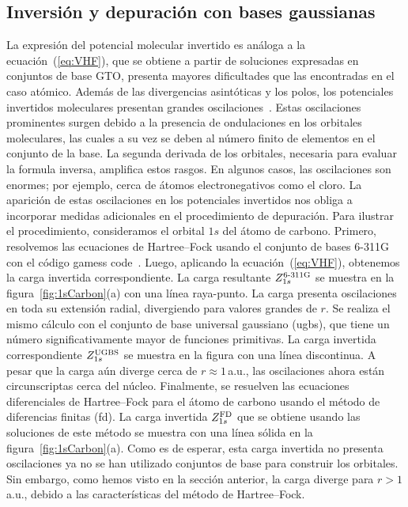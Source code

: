 \subsection{Inversión y depuración con bases gaussianas}
\label{subsec:invdepGTO}

La expresión del potencial molecular invertido es análoga a la
ecuación~(\ref{eq:VHF}), que se obtiene a partir de soluciones expresadas
en conjuntos de base GTO, presenta mayores dificultades que las encontradas
en el caso atómico. Además de las divergencias asintóticas y los polos, 
los potenciales invertidos moleculares presentan grandes 
oscilaciones~\cite{Schipper1997,Mura1997,Jacob2011,Gaiduk2013}. 
Estas oscilaciones prominentes surgen debido a la presencia de 
ondulaciones en los orbitales moleculares, las cuales a su vez se deben 
al número finito de elementos en el conjunto de la base. La segunda
derivada de los orbitales, necesaria para evaluar la formula inversa,
amplifica estos rasgos. En algunos casos, las oscilaciones son enormes;
por ejemplo, cerca de átomos electronegativos como el cloro. La 
aparición de estas oscilaciones en los potenciales invertidos nos obliga
a incorporar medidas adicionales en el procedimiento de depuración.
Para ilustrar el procedimiento, consideramos el orbital $1s$ del
átomo de carbono. Primero, resolvemos las ecuaciones de Hartree--Fock 
usando el conjunto de bases \mbox{6-311G} con el código {\sc gamess} code~\cite{Schmidt1993,Gordon2005}. Luego, aplicando la ecuación~(\ref{eq:VHF}),
obtenemos la carga invertida correspondiente. La carga resultante
$Z_{1s}^{\mbox{\scriptsize 6-311G}}$ se muestra en la 
figura~\ref{fig:1sCarbon}(a) con una línea raya-punto. La carga presenta
oscilaciones en toda su extensión radial, divergiendo para valores 
grandes de $r$. Se realiza el mismo cálculo con el conjunto de base 
universal gaussiano (\acs{ugbs}), que tiene un número significativamente 
mayor de funciones primitivas. La carga invertida correspondiente 
$Z_{1s}^{\mbox{\scriptsize UGBS}}$ se muestra en la figura con una línea 
discontinua. A pesar que la carga aún diverge cerca de $r\approx1\,$a.u., 
las oscilaciones ahora están circunscriptas cerca del núcleo. Finalmente,
se resuelven las ecuaciones diferenciales de Hartree--Fock para el 
átomo de carbono usando el método de diferencias finitas (\acs{fd}). La
carga invertida $Z_{1s}^{\mbox{\scriptsize FD}}$ que se obtiene usando 
las soluciones de este método se muestra con una línea sólida en la 
figura~\ref{fig:1sCarbon}(a). Como es de esperar, esta carga invertida 
no presenta oscilaciones ya no se han utilizado conjuntos de base para
construir los orbitales. Sin embargo, como hemos visto en la sección
anterior, la carga diverge para $r>1\,$a.u., debido a las características
del método de Hartree--Fock.

